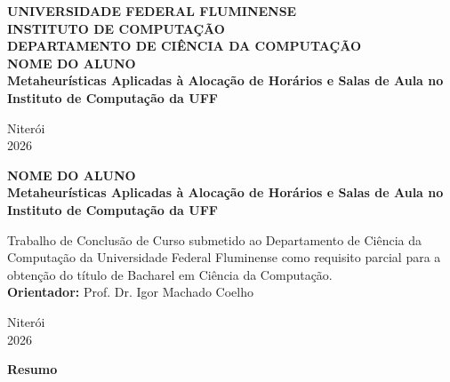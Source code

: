 \documentclass[12pt,a4paper]{article}
\begin{document}

\begin{titlepage}
\begin{center}
    {\large \textbf{UNIVERSIDADE FEDERAL FLUMINENSE}}\\[0.2cm]
    {\large \textbf{INSTITUTO DE COMPUTAÇÃO}}\\[0.2cm]
    {\large \textbf{DEPARTAMENTO DE CIÊNCIA DA COMPUTAÇÃO}}\\[4cm]

    {\large \textbf{NOME DO ALUNO}}\\[3.5cm]

    {\Large \textbf{Metaheurísticas Aplicadas à Alocação de Horários e Salas de Aula no Instituto de Computação da UFF}}\\[4cm]

    \vfill

    {\large Niterói}\\[0.2cm]
    {\large 2026}
\end{center}
\end{titlepage}

\newpage

\begin{center}
    {\large \textbf{NOME DO ALUNO}}\\[3cm]
    {\Large \textbf{Metaheurísticas Aplicadas à Alocação de Horários e Salas de Aula no Instituto de Computação da UFF}}\\[3cm]
\end{center}

\vspace{2cm}
\hfill
\begin{minipage}{0.5\textwidth}
    Trabalho de Conclusão de Curso submetido ao Departamento de Ciência da Computação da Universidade Federal Fluminense como requisito parcial para a obtenção do título de Bacharel em Ciência da Computação.\\[0.5cm]
    \textbf{Orientador:} Prof. Dr. Igor Machado Coelho
\end{minipage}

\vfill

\begin{center}
    {\large Niterói}\\[0.2cm]
    {\large 2026}
\end{center}

\newpage


\begin{center}
    \textbf{\large Resumo}
\end{center}
\vspace{0.5cm}
\end{document}
